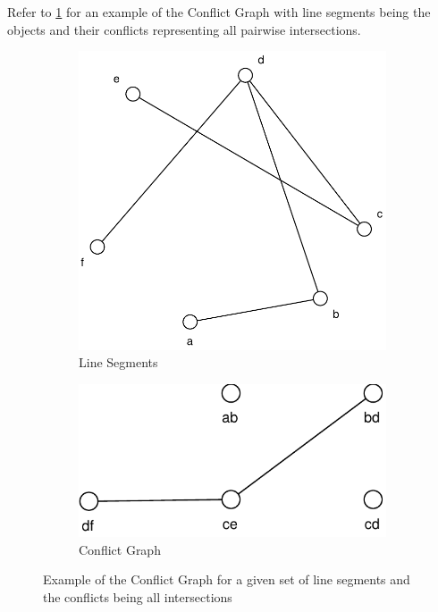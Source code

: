 Refer to \cref{fig:example_conflict_graph} for an example of the
Conflict Graph with line segments being the objects and their
conflicts representing all pairwise intersections.

\begin{figure}[ht]
  \centering
  \begin{subfigure}{0.4\textwidth}
          \centering
          \includegraphics[width=\textwidth]{img/example_conflict_graph_segments.pdf}
          \caption{Line Segments}
  \end{subfigure}
  \hspace{2em}
  \VRule
  \hspace{2em}
  \begin{subfigure}{0.4\textwidth}
          \centering
          \includegraphics[width=\textwidth]{img/example_conflict_graph.pdf}
          \caption{Conflict Graph}
  \end{subfigure}  
  \caption{\label{fig:example_conflict_graph}Example of the Conflict %
    Graph for a given set of line segments %
    and the conflicts being all intersections}
\end{figure}


